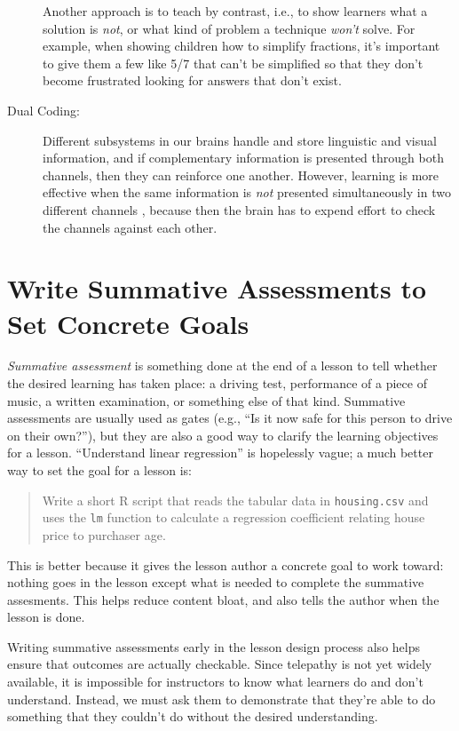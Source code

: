 \documentclass[10pt,letterpaper]{article}
\newcommand{\rulemajor}[1]{\section{#1}}
\begin{document}
\begin{description}
  Another approach is to teach by contrast, i.e., to show learners what a
  solution is \emph{not}, or what kind of problem a technique \emph{won't}
  solve. For example, when showing children how to simplify fractions, it's
  important to give them a few like 5/7 that can't be simplified so that they
  don't become frustrated looking for answers that don't exist.

\item[Dual Coding:] Different subsystems in our brains handle and store
  linguistic and visual information, and if complementary information is
  presented through both channels, then they can reinforce one another. However,
  learning is more effective when the same information is \emph{not} presented
  simultaneously in two different channels \cite{Maye2003,Maye2009}, because
  then the brain has to expend effort to check the channels against each other.

\end{description}

\rulemajor{Write Summative Assessments to Set Concrete Goals}

\emph{Summative assessment} is something done at the end of a lesson to tell
whether the desired learning has taken place: a driving test, performance of a
piece of music, a written examination, or something else of that kind.
Summative assessments are usually used as gates (e.g., ``Is it now safe for this
person to drive on their own?''), but they are also a good way to clarify the
learning objectives for a lesson.  ``Understand linear regression'' is
hopelessly vague; a much better way to set the goal for a lesson is:

\begin{quotation}

  \noindent
  Write a short R script that reads the tabular data in \texttt{housing.csv}
  and uses the \texttt{lm} function to calculate a regression coefficient
  relating house price to purchaser age.

\end{quotation}

This is better because it gives the lesson author a concrete goal to work
toward: nothing goes in the lesson except what is needed to complete the
summative assesments.  This helps reduce content bloat, and also tells the
author when the lesson is done.

Writing summative assessments early in the lesson design process also helps
ensure that outcomes are actually checkable.  Since telepathy is not yet widely
available, it is impossible for instructors to know what learners do and don't
understand.  Instead, we must ask them to demonstrate that they're able to do
something that they couldn't do without the desired understanding.
\end{document}
